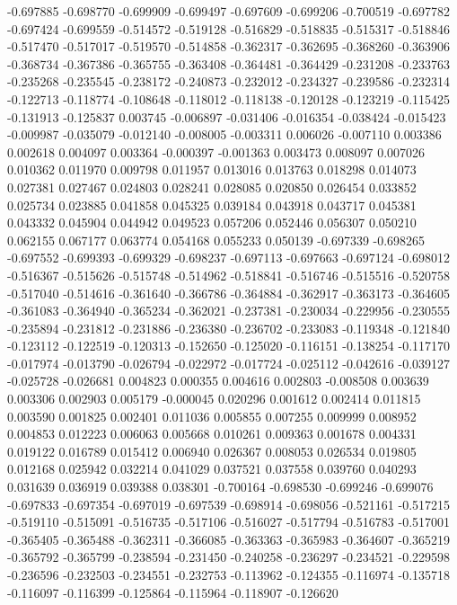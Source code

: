 -0.697885
-0.698770
-0.699909
-0.699497
-0.697609
-0.699206
-0.700519
-0.697782
-0.697424
-0.699559
-0.514572
-0.519128
-0.516829
-0.518835
-0.515317
-0.518846
-0.517470
-0.517017
-0.519570
-0.514858
-0.362317
-0.362695
-0.368260
-0.363906
-0.368734
-0.367386
-0.365755
-0.363408
-0.364481
-0.364429
-0.231208
-0.233763
-0.235268
-0.235545
-0.238172
-0.240873
-0.232012
-0.234327
-0.239586
-0.232314
-0.122713
-0.118774
-0.108648
-0.118012
-0.118138
-0.120128
-0.123219
-0.115425
-0.131913
-0.125837
0.003745
-0.006897
-0.031406
-0.016354
-0.038424
-0.015423
-0.009987
-0.035079
-0.012140
-0.008005
-0.003311
0.006026
-0.007110
0.003386
0.002618
0.004097
0.003364
-0.000397
-0.001363
0.003473
0.008097
0.007026
0.010362
0.011970
0.009798
0.011957
0.013016
0.013763
0.018298
0.014073
0.027381
0.027467
0.024803
0.028241
0.028085
0.020850
0.026454
0.033852
0.025734
0.023885
0.041858
0.045325
0.039184
0.043918
0.043717
0.045381
0.043332
0.045904
0.044942
0.049523
0.057206
0.052446
0.056307
0.050210
0.062155
0.067177
0.063774
0.054168
0.055233
0.050139
-0.697339
-0.698265
-0.697552
-0.699393
-0.699329
-0.698237
-0.697113
-0.697663
-0.697124
-0.698012
-0.516367
-0.515626
-0.515748
-0.514962
-0.518841
-0.516746
-0.515516
-0.520758
-0.517040
-0.514616
-0.361640
-0.366786
-0.364884
-0.362917
-0.363173
-0.364605
-0.361083
-0.364940
-0.365234
-0.362021
-0.237381
-0.230034
-0.229956
-0.230555
-0.235894
-0.231812
-0.231886
-0.236380
-0.236702
-0.233083
-0.119348
-0.121840
-0.123112
-0.122519
-0.120313
-0.152650
-0.125020
-0.116151
-0.138254
-0.117170
-0.017974
-0.013790
-0.026794
-0.022972
-0.017724
-0.025112
-0.042616
-0.039127
-0.025728
-0.026681
0.004823
0.000355
0.004616
0.002803
-0.008508
0.003639
0.003306
0.002903
0.005179
-0.000045
0.020296
0.001612
0.002414
0.011815
0.003590
0.001825
0.002401
0.011036
0.005855
0.007255
0.009999
0.008952
0.004853
0.012223
0.006063
0.005668
0.010261
0.009363
0.001678
0.004331
0.019122
0.016789
0.015412
0.006940
0.026367
0.008053
0.026534
0.019805
0.012168
0.025942
0.032214
0.041029
0.037521
0.037558
0.039760
0.040293
0.031639
0.036919
0.039388
0.038301
-0.700164
-0.698530
-0.699246
-0.699076
-0.697833
-0.697354
-0.697019
-0.697539
-0.698914
-0.698056
-0.521161
-0.517215
-0.519110
-0.515091
-0.516735
-0.517106
-0.516027
-0.517794
-0.516783
-0.517001
-0.365405
-0.365488
-0.362311
-0.366085
-0.363363
-0.365983
-0.364607
-0.365219
-0.365792
-0.365799
-0.238594
-0.231450
-0.240258
-0.236297
-0.234521
-0.229598
-0.236596
-0.232503
-0.234551
-0.232753
-0.113962
-0.124355
-0.116974
-0.135718
-0.116097
-0.116399
-0.125864
-0.115964
-0.118907
-0.126620
